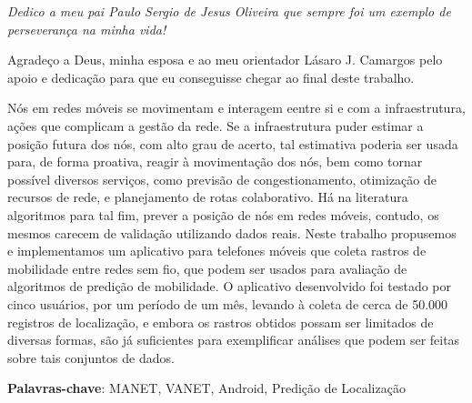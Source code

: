 \documentclass[12pt, %
openright, 
oneside,
a4paper,
brazil]{facom-ufu-abntex2}
\begin{document}
\begin{dedicatoria}
   \vspace*{\fill}
   \centering
   \noindent
   \textit{Dedico a meu pai Paulo Sergio de Jesus Oliveira que sempre foi um exemplo de perseverança na minha vida!}  %
   \vspace*{\fill}
\end{dedicatoria}

\begin{agradecimentos}
Agradeço a Deus, minha esposa e ao meu orientador Lásaro J. Camargos pelo apoio e dedicação para que eu conseguisse chegar ao final deste trabalho. %
\end{agradecimentos}




\begin{resumo} %

Nós  em redes móveis se movimentam e interagem eentre si e com a infraestrutura, ações que complicam a gestão da rede. Se a infraestrutura puder estimar a posição futura dos nós, com alto grau de acerto, tal estimativa poderia ser usada para, de forma proativa, reagir à movimentação dos nós, bem como tornar possível diversos serviços, como previsão de congestionamento, otimização de recursos de rede, e planejamento de rotas colaborativo. Há na literatura algoritmos para tal fim, prever a posição de nós em redes móveis, contudo, os mesmos carecem de validação utilizando dados reais. Neste trabalho propusemos e implementamos um aplicativo para telefones móveis que coleta rastros de mobilidade entre redes sem fio, que podem ser usados para avaliação de algoritmos de predição de mobilidade. O aplicativo desenvolvido foi testado por cinco usuários, por um período de um mês, levando à coleta de cerca de 50.000 registros de localização, e embora os rastros obtidos possam ser limitados de diversas formas, são já suficientes para exemplificar análises que podem ser feitas sobre tais conjuntos de dados.

 \vspace{\onelineskip}
    
 \noindent
 \textbf{Palavras-chave}: MANET, VANET, Android, Predição de Localização%
\end{resumo}
\end{document}
